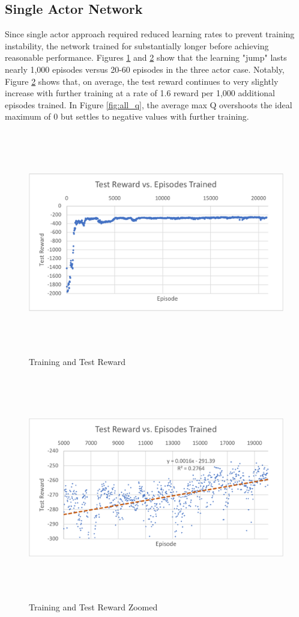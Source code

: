 \subsection{Single Actor Network}
Since single actor approach required reduced learning rates to prevent training instability, the network trained for substantially longer before achieving reasonable performance. Figures \ref{fig:all_r} and \ref{fig:all_rzoom} show that the learning "jump" lasts nearly 1,000 episodes versus 20-60 episodes in the three actor case. Notably, Figure \ref{fig:all_rzoom} shows that, on average, the test reward continues to very slightly increase with further training at a rate of 1.6 reward per 1,000 additional episodes trained. In Figure \ref{fig:all_q}, the average max Q overshoots the ideal maximum of 0 but settles to negative values with further training.
\begin{figure}[H]
	\includegraphics[width=6in, height=3.85in, keepaspectratio]{figures/train_figs/all_r.pdf}
	\caption{Training and Test Reward} \label{fig:all_r}
\end{figure}
\begin{figure}[H]
	\includegraphics[width=6in, height=3.85in, keepaspectratio]{figures/train_figs/all_rzoom.pdf}
	\caption{Training and Test Reward Zoomed} \label{fig:all_rzoom}
\end{figure}
